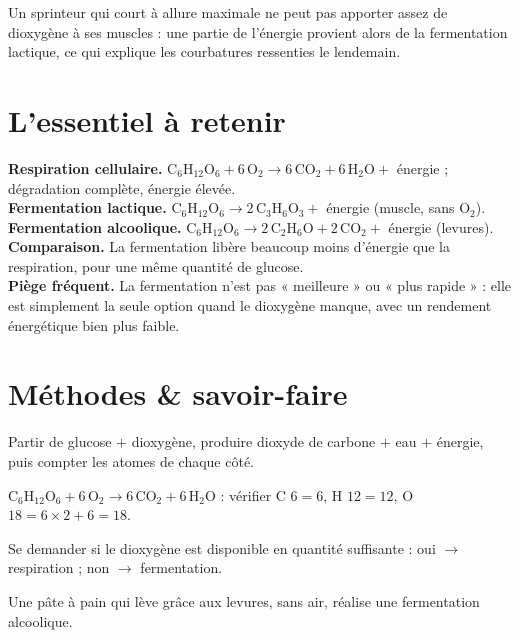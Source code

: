 \begin{exemple}
Un sprinteur qui court à allure maximale ne peut pas apporter assez de dioxygène à ses
muscles : une partie de l'énergie provient alors de la fermentation lactique, ce qui
explique les courbatures ressenties le lendemain.
\end{exemple}

\section{L'essentiel à retenir}

\begin{synthese}
\textbf{Respiration cellulaire.} $\mathrm{C_6H_{12}O_6+6\,O_2\to6\,CO_2+6\,H_2O+}$
énergie ; dégradation complète, énergie élevée.\\[4pt]
\textbf{Fermentation lactique.} $\mathrm{C_6H_{12}O_6\to2\,C_3H_6O_3+}$ énergie (muscle,
sans $\mathrm{O_2}$).\\[4pt]
\textbf{Fermentation alcoolique.} $\mathrm{C_6H_{12}O_6\to2\,C_2H_6O+2\,CO_2+}$ énergie
(levures).\\[4pt]
\textbf{Comparaison.} La fermentation libère beaucoup moins d'énergie que la respiration,
pour une même quantité de glucose.\\[4pt]
\textbf{Piège fréquent.} La fermentation n'est pas « meilleure » ou « plus rapide » : elle
est simplement la seule option quand le dioxygène manque, avec un rendement énergétique
bien plus faible.
\end{synthese}

\section{Méthodes \& savoir-faire}

Partir de glucose $+$ dioxygène, produire dioxyde de carbone $+$ eau $+$ énergie, puis
compter les atomes de chaque côté.
\begin{exemple}
$\mathrm{C_6H_{12}O_6+6\,O_2\to6\,CO_2+6\,H_2O}$ : vérifier C $6=6$, H $12=12$, O
$18=6\times2+6=18$.
\end{exemple}

Se demander si le dioxygène est disponible en quantité suffisante : oui $\to$
respiration ; non $\to$ fermentation.
\begin{exemple}
Une pâte à pain qui lève grâce aux levures, sans air, réalise une fermentation
alcoolique.
\end{exemple}

